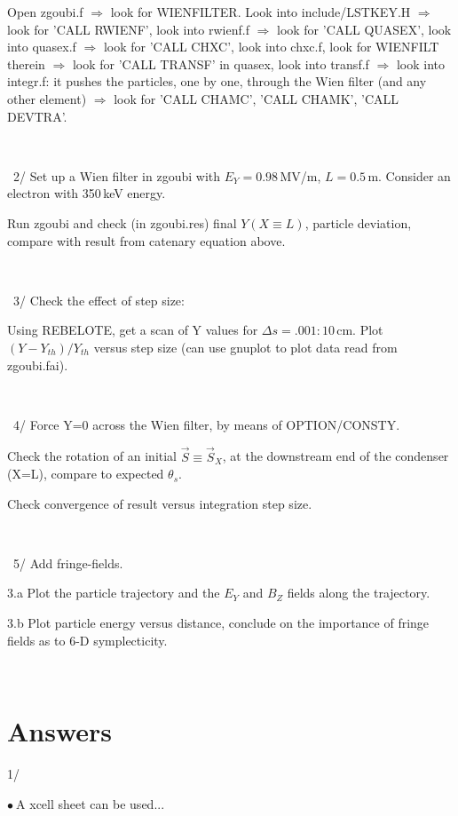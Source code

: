 \documentclass[10pt]{article}
\newcommand{\nib}{\noindent \ensuremath{\bullet~}}
\newcommand{\nin}{\noindent~}
\begin{document}
Open zgoubi.f $\Rightarrow$ look for WIENFILTER. Look into include/LSTKEY.H  $\Rightarrow$  look for 'CALL RWIENF', look into rwienf.f
$\Rightarrow$  look for 'CALL QUASEX', look into quasex.f $\Rightarrow$ look for 'CALL CHXC', look into chxc.f,
look for WIENFILT therein
$\Rightarrow$ look for 'CALL TRANSF' in quasex, look into transf.f $\Rightarrow$ look into integr.f: it pushes the particles, one by one,
through the Wien filter (and any other element) $\Rightarrow$  look for 'CALL CHAMC', 'CALL CHAMK', 'CALL DEVTRA'.

~

\nin 2/ Set up a Wien filter in zgoubi with $ E_Y=0.98$\,MV/m,  $ L=0.5$\,m.
Consider an electron with 350\,keV energy. 

 Run zgoubi and check (in zgoubi.res)  final $Y(X\equiv L)$,  particle deviation, compare with result from catenary equation above.

~

\nin 3/ Check the effect of step size:

Using REBELOTE, get a scan of Y values for $ \Delta s = .001:10$\,cm.
   Plot $(Y-Y_{th})/Y_{th}$ versus step size (can use gnuplot to plot data read from zgoubi.fai).

   ~

   \nin 4/
   Force Y=0 across the Wien filter, by means of OPTION/CONSTY.

   Check the rotation of an initial $\vec S \equiv \vec S_X$, at the downstream end of the condenser (X=L), compare to expected $\theta_s$. 

Check convergence of result versus integration step size. 
   
   ~

   \nin 5/ Add fringe-fields.

   3.a  Plot the particle trajectory and the $E_Y$ and $B_Z$ fields along the trajectory.

   3.b  Plot particle energy versus distance, conclude on the importance of fringe fields as to 6-D symplecticity. 

   ~




   \clearpage

   \section*{Answers}

   1/
   
   \nib A xcell sheet can be used...
\end{document}
